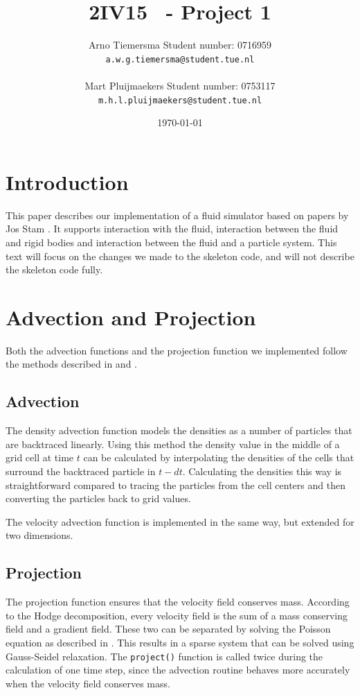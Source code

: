 \documentclass[a4paper,twoside,11pt,twocolumn]{article}
\title{\sffamily\bfseries 2IV15 \scg\ - Project 1}
\author{Arno Tiemersma \qquad Student number: 0716959 \\{\tt a.w.g.tiemersma@student.tue.nl}\\ \\Mart Pluijmaekers \qquad Student number: 0753117 \\{\tt m.h.l.pluijmaekers@student.tue.nl}}
\date{\today}
\begin{document}
\maketitle
\section{Introduction}
This paper describes our implementation of a fluid simulator based on papers by Jos Stam \cite{url:stam1, url:stam2}. It supports interaction with the fluid, interaction between the fluid and rigid bodies and interaction between the fluid and a particle system. This text will focus on the changes we made to the skeleton code, and will not describe the skeleton code fully.

\section{Advection and Projection}
Both the advection functions and the projection function we implemented follow the methods described in \cite{url:stam1} and \cite{url:stam2}.

\subsection{Advection}
The density advection function models the densities as a number of particles that are backtraced linearly. Using this method the density value in the middle of a grid cell at time $t$ can be calculated by interpolating the densities of the cells that surround the backtraced particle in $t-dt$. Calculating the densities this way is straightforward compared to tracing the particles from the cell centers and then converting the particles back to grid values. 

The velocity advection function is implemented in the same way, but extended for two dimensions.

\subsection{Projection}
The projection function ensures that the velocity field conserves mass. According to the Hodge decomposition, every velocity field is the sum of a mass conserving field and a gradient field. These two can be separated by solving the Poisson equation as described in \cite{url:stam2}. This results in a sparse system that can be solved using Gauss-Seidel relaxation. The \texttt{project()} function is called twice during the calculation of one time step, since the advection routine behaves more accurately when the velocity field conserves mass. 
\end{document}
